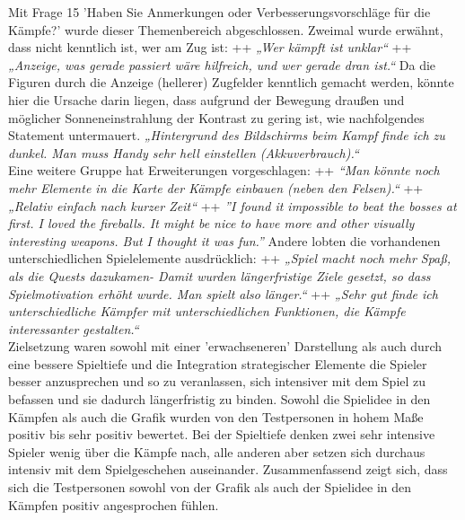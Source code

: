 \documentclass[extern,palatino]{cgBA}
\begin{document}
Mit Frage 15 'Haben Sie Anmerkungen oder Verbesserungsvorschläge für die Kämpfe?' wurde dieser Themenbereich abgeschlossen. Zweimal wurde erwähnt, dass nicht kenntlich ist, wer am Zug ist: ++  \textit{„Wer kämpft ist unklar“} ++ \textit{„Anzeige, was gerade passiert wäre hilfreich, und wer gerade dran ist.“} Da die Figuren durch die Anzeige (hellerer) Zugfelder kenntlich gemacht werden, könnte hier die Ursache darin liegen, dass aufgrund der Bewegung draußen und möglicher Sonneneinstrahlung der Kontrast zu gering ist, wie nachfolgendes Statement untermauert. \textit{„Hintergrund des Bildschirms beim Kampf finde ich zu dunkel. Man muss Handy sehr hell einstellen (Akkuverbrauch).“}\\
Eine weitere Gruppe hat Erweiterungen vorgeschlagen: ++  \textit{“Man könnte noch mehr Elemente in die Karte der Kämpfe einbauen (neben den Felsen).“} ++ \textit{„Relativ einfach nach kurzer Zeit“} ++ \textit{”I found it impossible to beat the bosses at first. I loved the fireballs. It might be nice to have more and other visually interesting weapons. But I thought it was fun.”} Andere lobten die vorhandenen unterschiedlichen Spielelemente ausdrücklich: ++ \textit{„Spiel macht noch mehr Spaß, als die Quests dazukamen- Damit wurden längerfristige Ziele gesetzt, so dass Spielmotivation erhöht wurde. Man spielt also länger.“} ++ \textit{„Sehr gut finde ich unterschiedliche Kämpfer mit unterschiedlichen Funktionen, die Kämpfe interessanter gestalten.“}
\\
Zielsetzung waren sowohl mit einer 'erwachseneren' Darstellung als auch durch eine bessere Spieltiefe und die Integration strategischer Elemente die Spieler besser anzusprechen und so zu veranlassen, sich intensiver mit dem Spiel zu befassen und sie dadurch längerfristig zu binden. Sowohl die Spielidee in den Kämpfen als auch die Grafik wurden von den Testpersonen in hohem Maße positiv bis sehr positiv bewertet. Bei der Spieltiefe denken zwei sehr intensive Spieler wenig über die Kämpfe nach, alle anderen aber setzen sich durchaus intensiv mit dem Spielgeschehen auseinander. Zusammenfassend zeigt sich, dass sich die Testpersonen sowohl von der Grafik als auch der Spielidee in den Kämpfen positiv angesprochen fühlen.
\newpage
\end{document}
